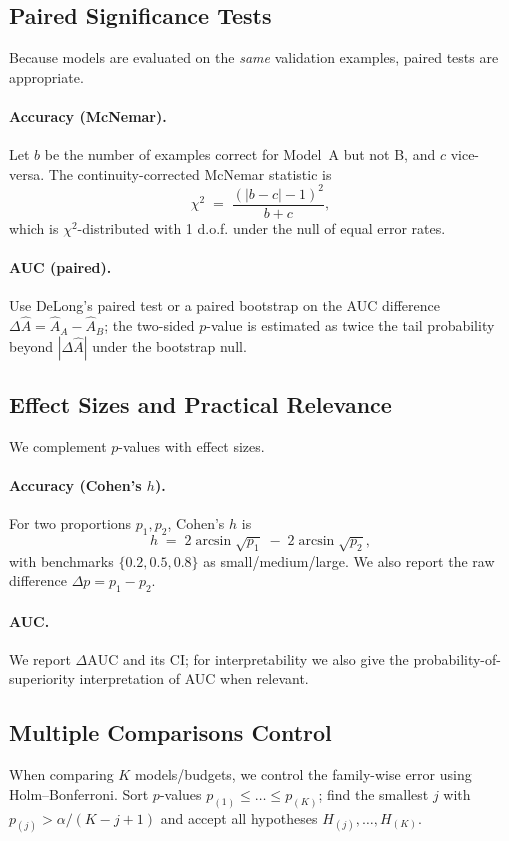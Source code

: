 \documentclass{article}
\begin{document}
\subsection{Paired Significance Tests}
Because models are evaluated on the \emph{same} validation examples, paired tests are appropriate.
\paragraph{Accuracy (McNemar).}
Let $b$ be the number of examples correct for Model~A but not B, and $c$ vice-versa. The continuity-corrected McNemar statistic is
\begin{equation}
\label{eq:mcnemar}
\chi^2 \;=\; \frac{(|b-c|-1)^2}{\,b+c\,},
\end{equation}
which is $\chi^2$-distributed with 1 d.o.f. under the null of equal error rates.
\paragraph{AUC (paired).}
Use DeLong’s paired test or a paired bootstrap on the AUC difference $\Delta\hat{A}=\hat{A}_{A}-\hat{A}_{B}$; the two-sided $p$-value is estimated as twice the tail probability beyond $|\Delta\hat{A}|$ under the bootstrap null.

\subsection{Effect Sizes and Practical Relevance}
We complement $p$-values with effect sizes.
\paragraph{Accuracy (Cohen’s $h$).}
For two proportions $p_1,p_2$, Cohen’s $h$ is
\begin{equation}
\label{eq:cohenh}
h \;=\; 2\arcsin\!\sqrt{p_1} \;-\; 2\arcsin\!\sqrt{p_2},
\end{equation}
with benchmarks $\{0.2,0.5,0.8\}$ as small/medium/large. We also report the raw difference $\Delta p=p_1-p_2$.
\paragraph{AUC.}
We report $\Delta\text{AUC}$ and its CI; for interpretability we also give the probability-of-superiority interpretation of AUC when relevant.

\subsection{Multiple Comparisons Control}
When comparing $K$ models/budgets, we control the family-wise error using Holm--Bonferroni. Sort $p$-values $p_{(1)}\le\dots\le p_{(K)}$; find the smallest $j$ with $p_{(j)} > \alpha/(K-j+1)$ and accept all hypotheses $H_{(j)},\dots,H_{(K)}$.
\end{document}
